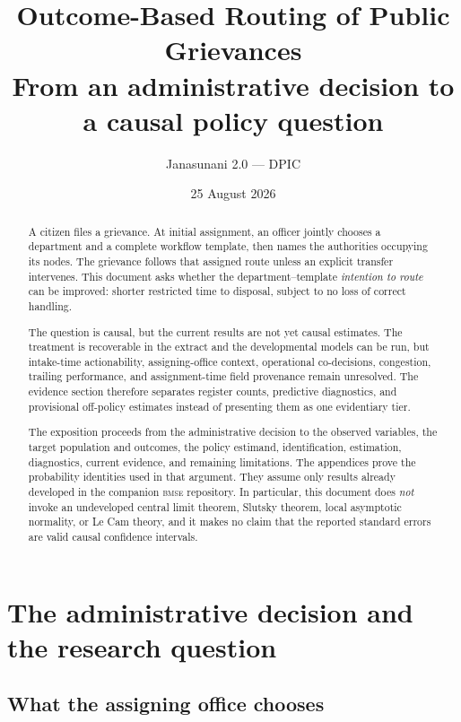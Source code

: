 \documentclass[11pt,a4paper]{article}
\title{Outcome-Based Routing of Public Grievances\\
\large From an administrative decision to a causal policy question}
\author{Janasunani 2.0 --- DPIC}
\date{25 August 2026}
\theoremstyle{plain}
\theoremstyle{definition}
\theoremstyle{remark}
\newcommand{\probrepo}{\textsc{bmse}}
\begin{document}
\maketitle

\begin{abstract}
A citizen files a grievance. At initial assignment, an officer jointly chooses a department
and a complete workflow template, then names the authorities occupying its nodes. The grievance
follows that assigned route unless an explicit transfer intervenes. This document asks whether
the department--template \emph{intention to route} can be improved: shorter restricted time to
disposal, subject to no loss of correct handling.

The question is causal, but the current results are not yet causal estimates. The treatment is
recoverable in the extract and the developmental models can be run, but intake-time
actionability, assigning-office context, operational co-decisions, congestion, trailing
performance, and assignment-time field provenance remain unresolved. The evidence section
therefore separates register counts, predictive diagnostics, and provisional off-policy
estimates instead of presenting them as one evidentiary tier.

The exposition proceeds from the administrative decision to the observed variables, the target
population and outcomes, the policy estimand, identification, estimation, diagnostics, current
evidence, and remaining limitations. The appendices prove the probability identities used in
that argument. They assume only results already developed in the companion \probrepo{}
repository. In particular, this document does \emph{not} invoke an undeveloped central limit
theorem, Slutsky theorem, local asymptotic normality, or Le Cam theory, and it makes no claim that
the reported standard errors are valid causal confidence intervals.
\end{abstract}

\tableofcontents
\newpage

\section{The administrative decision and the research question}\label{sec:intro}

\subsection{What the assigning office chooses}
\end{document}
